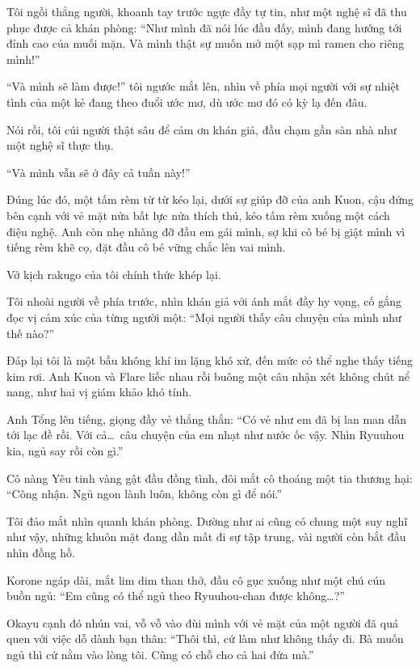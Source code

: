 \documentclass[../main.tex]{subfiles}
\begin{document}
Tôi ngồi thẳng người, khoanh tay trước ngực đầy tự tin, như một nghệ sĩ đã thu phục được cả khán phòng: ``Như mình đã nói lúc đầu đấy, mình đang hướng tới đỉnh cao của muối mặn. Và mình thật sự muốn mở một sạp mì ramen cho riêng mình!''

``Và mình sẽ làm được!'' tôi ngước mắt lên, nhìn về phía mọi người với sự nhiệt tình của một kẻ đang theo đuổi ước mơ, dù ước mơ đó có kỳ lạ đến đâu.

Nói rồi, tôi cúi người thật sâu để cảm ơn khán giả, đầu chạm gần sàn nhà như một nghệ sĩ thực thụ.

``Và mình vẫn sẽ ở đây cả tuần này!''

Đúng lúc đó, một tấm rèm từ từ kéo lại, dưới sự giúp đỡ của anh Kuon, cậu đứng bên cạnh với vẻ mặt nửa bất lực nửa thích thú, kéo tấm rèm xuống một cách điệu nghệ. Anh còn nhẹ nhàng đỡ đầu em gái mình, sợ khi cô bé bị giật mình vì tiếng rèm khẽ cọ, đặt đầu cô bé vững chắc lên vai mình.

Vở kịch rakugo của tôi chính thức khép lại.

\omk


Tôi nhoài người về phía trước, nhìn khán giả với ánh mắt đầy hy vọng, cố gắng đọc vị cảm xúc của từng người một: ``Mọi người thấy câu chuyện của mình như thế nào?''

Đáp lại tôi là một bầu không khí im lặng khó xử, đến mức có thể nghe thấy tiếng kim rơi. Anh Kuon và Flare liếc nhau rồi buông một câu nhận xét không chút nể nang, như hai vị giám khảo khó tính.

Anh Tổng lên tiếng, giọng đầy vẻ thẳng thắn: ``Có vẻ như em đã bị lan man dẫn tới lạc đề rồi. Với cả\dots\ câu chuyện của em nhạt như nước ốc vậy. Nhìn Ryuuhou kia, ngủ say rồi còn gì.''

Cô nàng Yêu tinh vàng gật đầu đồng tình, đôi mắt cô thoáng một tia thương hại: ``Công nhận. Ngủ ngon lành luôn, không còn gì để nói.''

Tôi đảo mắt nhìn quanh khán phòng. Dường như ai cũng có chung một suy nghĩ như vậy, những khuôn mặt đang dần mất đi sự tập trung, vài người còn bắt đầu nhìn đồng hồ.

Korone ngáp dài, mắt lim dim than thở, đầu cô gục xuống như một chú cún buồn ngủ: ``Em cũng có thể ngủ theo Ryuuhou-chan được không\dots?''

Okayu cạnh đó nhún vai, vỗ vỗ vào đùi mình với vẻ mặt của một người đã quá quen với việc dỗ dành bạn thân: ``Thôi thì, cứ làm như không thấy đi. Bà muốn ngủ thì cứ nằm vào lòng tôi. Cũng có chỗ cho cả hai đứa mà.''
\end{document}
